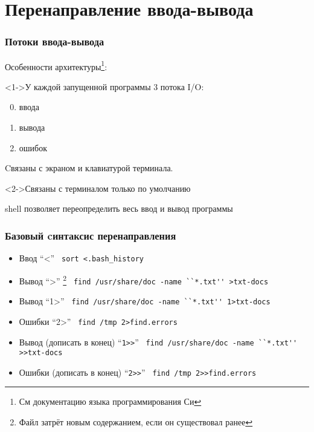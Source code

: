 \section{Перенаправление ввода-вывода}
\begin{frame}
  \frametitle{Потоки ввода-вывода}
  
  Особенности архитектуры\footnote{См документацию языка программирования Си}:
  \begin{block}<1->{У каждой запущенной программы 3 потока I/O:}
    \begin{enumerate}
      \setcounter{enumi}{-1}
      \item ввода
      \item вывода
      \item ошибок
    \end{enumerate}

    Cвязаны с экраном и клавиатурой терминала. \pause \newline
  \end{block}

  \begin{block}<2->{Связаны с терминалом только по умолчанию}

    \alert{shell позволяет переопределить весь ввод и вывод программы}
  \end{block}

\end{frame}

\begin{frame}[fragile]
  \frametitle{Базовый cинтаксис перенаправления}
  \begin{itemize}    
    \item \alert{Ввод} ``<'' \newline
      \verb+ sort <.bash_history+ \pause
    \item \alert{Вывод} ``>'' \footnote{Файл затрёт новым содержанием, если он существовал ранее} \newline
      \verb+ find /usr/share/doc -name ``*.txt'' >txt-docs+    
    \item \alert{Вывод} ``1>'' \newline
      \verb+ find /usr/share/doc -name ``*.txt'' 1>txt-docs+ \pause
    \item \alert{Ошибки} ``2>''\newline
      \verb+ find /tmp 2>find.errors+ \pause
    \item \alert{Вывод (дописать в конец)} ``\verb+1>>+'' \newline
      \verb+ find /usr/share/doc -name ``*.txt'' >>txt-docs+
    \item \alert{Ошибки (дописать в конец)} ``\verb+2>>+'' \newline 
      \verb+ find /tmp 2>>find.errors+ \pause
  \end{itemize}
\end{frame}

